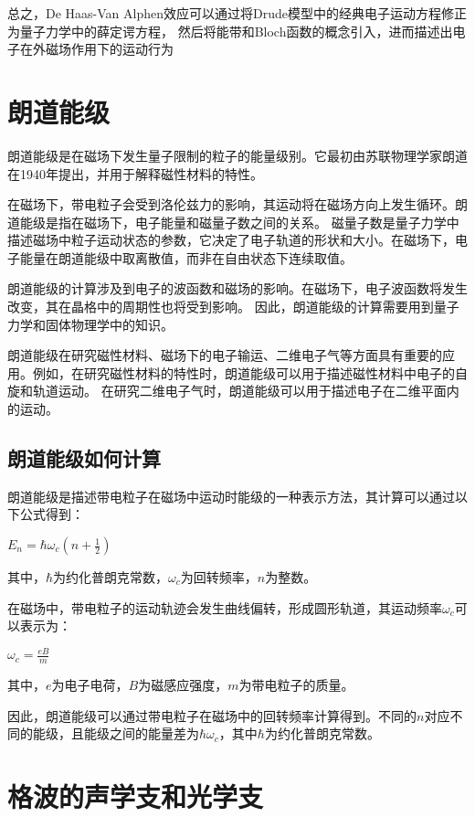 \documentclass[12pt, a4paper, oneside]{ctexart}
\begin{document}
\begin{spacing}{2.0}
总之，De Haas-Van Alphen效应可以通过将Drude模型中的经典电子运动方程修正为量子力学中的薛定谔方程，
然后将能带和Bloch函数的概念引入，进而描述出电子在外磁场作用下的运动行为



\section{朗道能级}
朗道能级是在磁场下发生量子限制的粒子的能量级别。它最初由苏联物理学家朗道在1940年提出，并用于解释磁性材料的特性。

在磁场下，带电粒子会受到洛伦兹力的影响，其运动将在磁场方向上发生循环。朗道能级是指在磁场下，电子能量和磁量子数之间的关系。
磁量子数是量子力学中描述磁场中粒子运动状态的参数，它决定了电子轨道的形状和大小。在磁场下，电子能量在朗道能级中取离散值，而非在自由状态下连续取值。

朗道能级的计算涉及到电子的波函数和磁场的影响。在磁场下，电子波函数将发生改变，其在晶格中的周期性也将受到影响。
因此，朗道能级的计算需要用到量子力学和固体物理学中的知识。

朗道能级在研究磁性材料、磁场下的电子输运、二维电子气等方面具有重要的应用。例如，在研究磁性材料的特性时，朗道能级可以用于描述磁性材料中电子的自旋和轨道运动。
在研究二维电子气时，朗道能级可以用于描述电子在二维平面内的运动。

\subsection{朗道能级如何计算}
朗道能级是描述带电粒子在磁场中运动时能级的一种表示方法，其计算可以通过以下公式得到：

$E_n=\hbar\omega_c\left(n+\frac{1}{2}\right)$

其中，$\hbar$为约化普朗克常数，$\omega_c$为回转频率，$n$为整数。

在磁场中，带电粒子的运动轨迹会发生曲线偏转，形成圆形轨道，其运动频率$\omega_c$可以表示为：

$\omega_c=\frac{eB}{m}$

其中，$e$为电子电荷，$B$为磁感应强度，$m$为带电粒子的质量。

因此，朗道能级可以通过带电粒子在磁场中的回转频率计算得到。不同的$n$对应不同的能级，且能级之间的能量差为$\hbar\omega_c$，其中$\hbar$为约化普朗克常数。

\section{格波的声学支和光学支}


\end{spacing}
\end{document}
